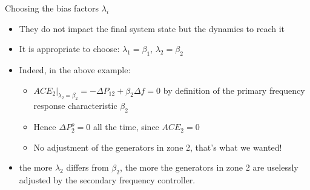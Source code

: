 \begin{frame}{Choosing the bias factors {\color{blue}$\lambda_i$}}
    \begin{itemize}
        \item They do not impact the final system state but the dynamics to reach it 
        \item It is appropriate to choose: $\lambda_1 = \beta_1$,  $\lambda_2 = \beta_2$ 
        \item Indeed, in the above example: 
        \begin{itemize}
            \item $ACE_2|_{\lambda_2=\beta_2} = -\Delta P_{12} + \beta_2 \Delta f = 0$ by definition of the primary frequency response characteristic $\beta_2$
            \item Hence $ \Delta P_2^o = 0$ all the time, since $ACE_2 = 0$ 
            \item No adjustment of the generators in zone 2,  that’s what we wanted! 
        \end{itemize}
        \item the more $\lambda_2$ differs from $\beta_2$, the more the generators in zone 2 are uselessly adjusted by the secondary frequency controller.
    \end{itemize}
\end{frame}



